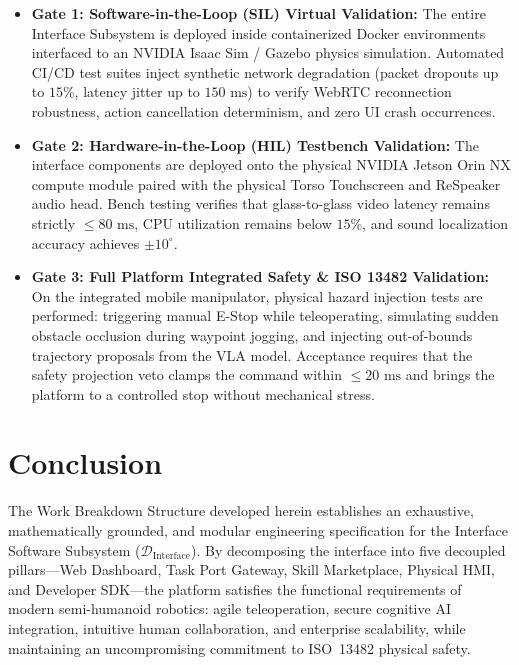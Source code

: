 \documentclass[10pt,a4paper]{article}
\begin{document}
\begin{itemize}[leftmargin=1.5em]
    \item \textbf{Gate 1: Software-in-the-Loop (SIL) Virtual Validation:}
    The entire Interface Subsystem is deployed inside containerized Docker environments interfaced to an NVIDIA Isaac Sim / Gazebo physics simulation. Automated CI/CD test suites inject synthetic network degradation (packet dropouts up to $15\%$, latency jitter up to $150\text{ ms}$) to verify WebRTC reconnection robustness, action cancellation determinism, and zero UI crash occurrences.
    
    \item \textbf{Gate 2: Hardware-in-the-Loop (HIL) Testbench Validation:}
    The interface components are deployed onto the physical NVIDIA Jetson Orin NX compute module paired with the physical Torso Touchscreen and ReSpeaker audio head. Bench testing verifies that glass-to-glass video latency remains strictly $\le 80\text{ ms}$, CPU utilization remains below $15\%$, and sound localization accuracy achieves $\pm 10^\circ$.
    
    \item \textbf{Gate 3: Full Platform Integrated Safety \& ISO 13482 Validation:}
    On the integrated mobile manipulator, physical hazard injection tests are performed: triggering manual E-Stop while teleoperating, simulating sudden obstacle occlusion during waypoint jogging, and injecting out-of-bounds trajectory proposals from the VLA model. Acceptance requires that the safety projection veto clamps the command within $\le 20\text{ ms}$ and brings the platform to a controlled stop without mechanical stress.
\end{itemize}

\section{Conclusion}
The Work Breakdown Structure developed herein establishes an exhaustive, mathematically grounded, and modular engineering specification for the Interface Software Subsystem ($\mathcal{D}_{\text{Interface}}$). By decomposing the interface into five decoupled pillars—Web Dashboard, Task Port Gateway, Skill Marketplace, Physical HMI, and Developer SDK—the platform satisfies the functional requirements of modern semi-humanoid robotics: agile teleoperation, secure cognitive AI integration, intuitive human collaboration, and enterprise scalability, while maintaining an uncompromising commitment to ISO~13482 physical safety.
\end{document}
